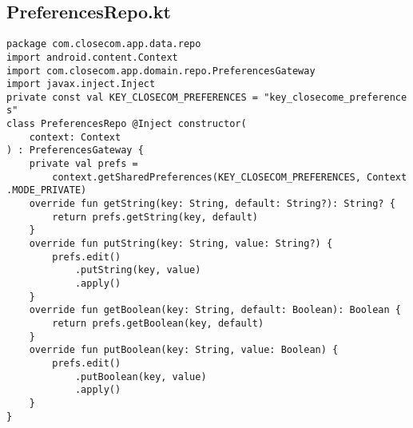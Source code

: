 \documentclass[listing]{espd}
\begin{document}
\subsection{PreferencesRepo.kt}
\begin{verbatim}
package com.closecom.app.data.repo
import android.content.Context
import com.closecom.app.domain.repo.PreferencesGateway
import javax.inject.Inject
private const val KEY_CLOSECOM_PREFERENCES = "key_closecome_preference
s"
class PreferencesRepo @Inject constructor(
    context: Context
) : PreferencesGateway {
    private val prefs =
        context.getSharedPreferences(KEY_CLOSECOM_PREFERENCES, Context
.MODE_PRIVATE)
    override fun getString(key: String, default: String?): String? {
        return prefs.getString(key, default)
    }
    override fun putString(key: String, value: String?) {
        prefs.edit()
            .putString(key, value)
            .apply()
    }
    override fun getBoolean(key: String, default: Boolean): Boolean {
        return prefs.getBoolean(key, default)
    }
    override fun putBoolean(key: String, value: Boolean) {
        prefs.edit()
            .putBoolean(key, value)
            .apply()
    }
}
\end{verbatim}
\end{document}

